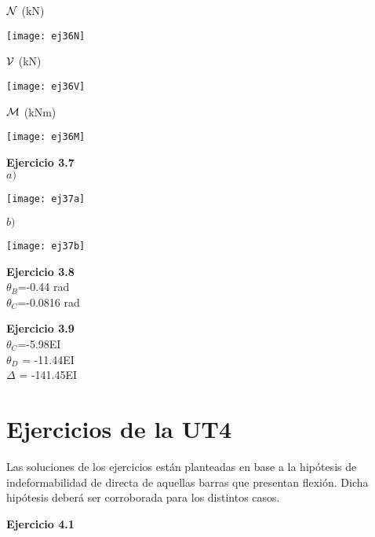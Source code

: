 ${\mathcal N}$ (kN)

\begin{center}
	\texttt{[image: ej36N]}
\end{center}

${\mathcal V}$ (kN)

\begin{center}
	\texttt{[image: ej36V]}
\end{center}

${\mathcal M}$ (kNm)

\begin{center}
	\texttt{[image: ej36M]}
\end{center}


\textbf{Ejercicio 3.7}\\

$a)$

\begin{center}
	\texttt{[image: ej37a]}
\end{center}

$b)$

\begin{center}
	\texttt{[image: ej37b]}
\end{center}

\textbf{Ejercicio 3.8}\\

$\theta_B$=-0.44 rad \\
$\theta_C$=-0.0816 rad\newline

\textbf{Ejercicio 3.9}\\

$\theta_C$=-5.98\;EI \\
$\theta_D$ = -11.44\;EI \\
$\Delta$ = -141.45\;EI


\section{Ejercicios de la UT4}

Las soluciones de los ejercicios están planteadas en base a la hipótesis de indeformabilidad de directa de aquellas barras que presentan flexión. Dicha hipótesis deberá ser corroborada para los distintos casos.

\textbf{Ejercicio 4.1}\\

